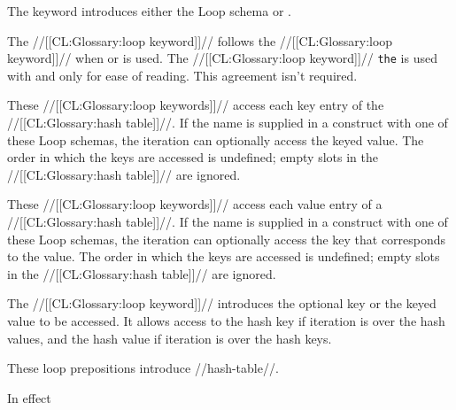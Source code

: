 \beginlist
 
             
The keyword  introduces either the Loop schema 
 or .
 
 
The //[[CL:Glossary:loop keyword]]// 
follows the //[[CL:Glossary:loop keyword]]//  when  or
 is used.  The //[[CL:Glossary:loop keyword]]// {\tt the} is used with
 and  only for ease of reading.
This agreement isn't required.
 
 
These //[[CL:Glossary:loop keywords]]// access each key entry of the //[[CL:Glossary:hash table]]//.  If 
the name  is supplied in a  construct with one
of these Loop schemas, the iteration can optionally access the keyed
value. The order in which the keys are accessed is undefined; empty
slots in the //[[CL:Glossary:hash table]]// are ignored.  
 
 
These //[[CL:Glossary:loop keywords]]// access each value entry of a 
//[[CL:Glossary:hash table]]//.  If 
the name  is supplied in a  construct with one of
these Loop schemas, the iteration can optionally access the key that
corresponds to the value.  The order in which the keys are accessed is
undefined; empty slots in the //[[CL:Glossary:hash table]]// are ignored. 
 
 
The //[[CL:Glossary:loop keyword]]//  introduces 
the optional key or the keyed value to
be accessed.  It allows access to the hash key if iteration is over
the hash values, and the hash value if 
iteration is over the hash keys.
 
 
These loop prepositions introduce //hash-table//.
 
\endlist


In effect 






